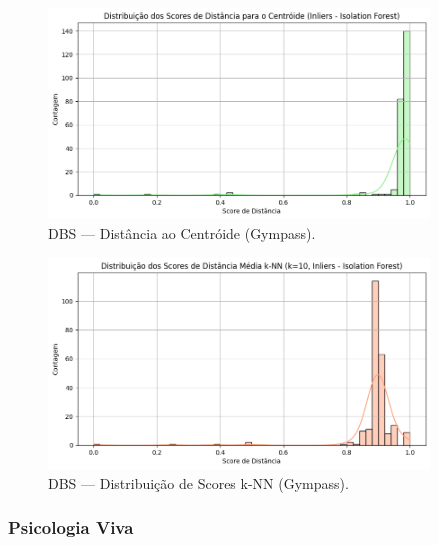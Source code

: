 \begin{figure}[H]
    \centering
    \includegraphics[width=0.9\textwidth]{imagens/gympass_centroid.png}
    \caption{DBS — Distância ao Centróide (Gympass).}
    \label{fig:gympass_centroid}
\end{figure}

\begin{figure}[H]
    \centering
    \includegraphics[width=0.9\textwidth]{imagens/gympass_knn.png}
    \caption{DBS — Distribuição de Scores k-NN (Gympass).}
    \label{fig:gympass_knn}
\end{figure}

\subsubsection*{Psicologia Viva}

